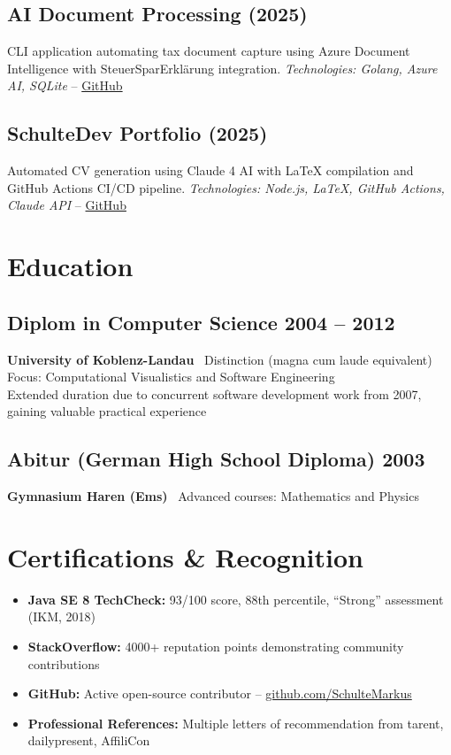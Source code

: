 \documentclass[10pt,a4paper]{article}
\begin{document}
\subsection{AI Document Processing (2025)}
CLI application automating tax document capture using Azure Document Intelligence with SteuerSparErkl\"arung integration.
\textit{Technologies: Golang, Azure AI, SQLite} -- \href{https://github.com/SchulteDev/Sse-BelMngr-Hermine}{GitHub}

\subsection{SchulteDev Portfolio (2025)}
Automated CV generation using Claude 4 AI with LaTeX compilation and GitHub Actions CI/CD pipeline.
\textit{Technologies: Node.js, LaTeX, GitHub Actions, Claude API} -- \href{https://github.com/SchulteDev/SchulteDev}{GitHub}

\vfill

\newpage

\section{Education}

\subsection{Diplom in Computer Science \hfill 2004 -- 2012}
\textbf{University of Koblenz-Landau} \textbar\ Distinction (magna cum laude equivalent)\\
Focus: Computational Visualistics and Software Engineering\\
Extended duration due to concurrent software development work from 2007, gaining valuable practical experience

\subsection{Abitur (German High School Diploma) \hfill 2003}
\textbf{Gymnasium Haren (Ems)} \textbar\ Advanced courses: Mathematics and Physics

\section{Certifications \& Recognition}

\begin{itemize}[leftmargin=15pt]
\item \textbf{Java SE 8 TechCheck:} 93/100 score, 88th percentile, ``Strong'' assessment (IKM, 2018)
\item \textbf{StackOverflow:} 4000+ reputation points demonstrating community contributions
\item \textbf{GitHub:} Active open-source contributor -- \href{https://github.com/SchulteMarkus}{github.com/SchulteMarkus}
\item \textbf{Professional References:} Multiple letters of recommendation from tarent, dailypresent, AffiliCon
\end{itemize}
\end{document}
